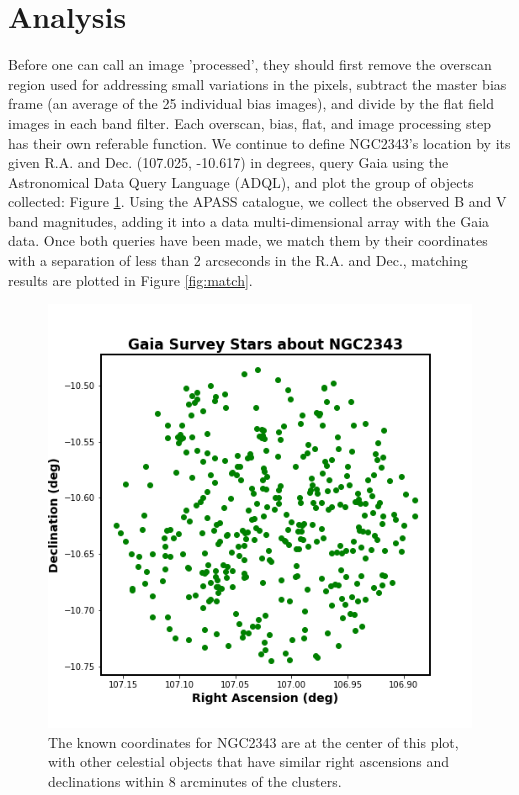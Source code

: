 \documentclass[linenumbers]{aastex631}
\begin{document}
\section{Analysis}\label{analysis}
Before one can call an image 'processed', they should first remove the overscan region used for addressing small variations in the pixels, subtract the master bias frame (an average of the 25 individual bias images), and divide by the flat field images in each band filter. Each overscan, bias, flat, and image processing step has their own referable function. We continue to define NGC2343's location by its given R.A. and Dec. (107.025, -10.617) in degrees, query Gaia using the Astronomical Data Query Language (ADQL), and plot the group of objects collected: Figure \ref{fig:gaia}. Using the APASS catalogue, we collect the observed B and V band magnitudes, adding it into a data multi-dimensional array with the Gaia data. Once both queries have been made, we match them by their coordinates with a separation of less than 2 arcseconds in the R.A. and Dec., matching results are plotted in Figure \ref{fig:match}.
\begin{figure}
    \centering
    \includegraphics[scale = 0.5]{pngs/Gaia_Survey_Stars_about_NGC2343.png}
    \caption{\label{fig:gaia} The known coordinates for NGC2343 are at the center of this plot, with other celestial objects that have similar right ascensions and declinations within 8 arcminutes of the clusters.}
    \label{fig:gaia}
\end{figure}
\end{document}
